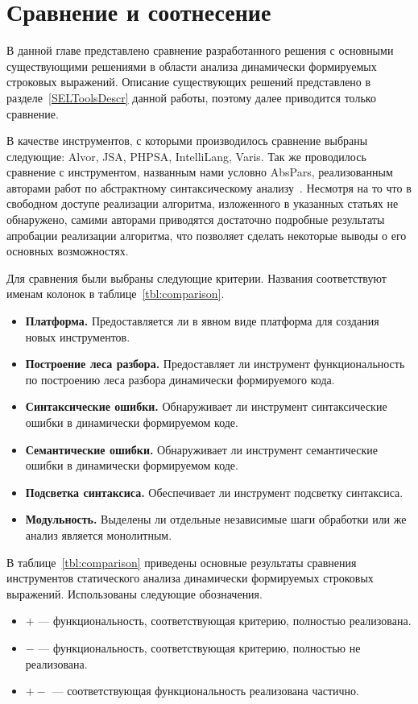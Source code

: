 \chapter{Сравнение и соотнесение} \label{chaptComp}

В данной главе представлено сравнение разработанного решения с основными существующими решениями в области анализа динамически формируемых строковых выражений. Описание существующих решений представлено в разделе~\ref{SELToolsDescr} данной работы, поэтому далее приводится только сравнение.

В качестве инструментов, с которыми производилось сравнение выбраны следующие: Alvor, JSA, PHPSA, IntelliLang, Varis. Так же проводилось сравнение с инструментом, названным нами условно AbsPars, реализованным авторами работ по абстрактному синтаксическому анализу~\cite{LrAbstract1, LrAbstract2, LRAbstractParsingSema}. Несмотря на то что в свободном доступе реализации алгоритма, изложенного в указанных статьях не обнаружено, самими авторами приводятся достаточно подробные результаты апробации реализации алгоритма, что позволяет сделать некоторые выводы о его основных возможностях.

Для сравнения были выбраны следующие критерии. Названия соответствуют именам колонок в таблице~\ref{tbl:comparison}.
\begin{itemize}
    \item \textbf{Платформа.} Предоставляется ли в явном виде платформа для создания новых инструментов. 
    \item \textbf{Построение леса разбора.} Предоставляет ли инструмент функциональность по построению леса разбора динамически формируемого кода.
    \item \textbf{Синтаксические ошибки.} Обнаруживает ли инструмент синтаксические ошибки в динамически формируемом коде.
    \item \textbf{Семантические ошибки.} Обнаруживает ли инструмент семантические ошибки в динамически формируемом коде.
    \item \textbf{Подсветка синтаксиса.} Обеспечивает ли инструмент подсветку синтаксиса.
    \item \textbf{Модульность.} Выделены ли отдельные независимые шаги обработки или же анализ является монолитным.
\end{itemize}

В таблице~\ref{tbl:comparison} приведены основные результаты сравнения инструментов статического анализа динамически формируемых строковых выражений. Использованы следующие обозначения.
\begin{itemize}
    \item $+$ --- функциональность, соответствующая критерию, полностью реализована.
    \item $-$ --- функциональность, соответствующая критерию, полностью не реализована.
    \item $+-$ --- соответствующая функциональность реализована частично.   
\end{itemize}

